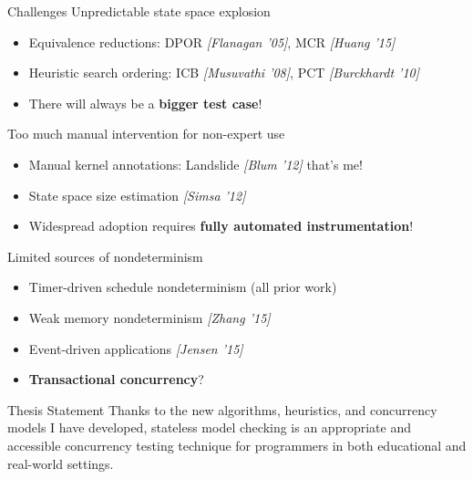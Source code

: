 \documentclass[xcolor=dvipsnames]{beamer}
\begin{document}
\begin{frame}{Challenges} %
	Unpredictable state space explosion
	\begin{itemize}
		\item Equivalence reductions: DPOR {\em [Flanagan '05]}, MCR {\em [Huang '15]}
		\item Heuristic search ordering: ICB {\em [Musuvathi '08]}, PCT {\em [Burckhardt '10]}
		\item There will always be a {\bf bigger test case}!
	\end{itemize}
	\pause
	\linegap

	Too much manual intervention for non-expert use
	\begin{itemize}
		\item Manual kernel annotations: Landslide {\em [Blum '12]} {\tiny that's me!}
		\item State space size estimation {\em [Simsa '12]}
		\item Widespread adoption requires {\bf fully automated instrumentation}!
	\end{itemize}
	\pause
	\linegap

	Limited sources of nondeterminism
	\begin{itemize}
		\item Timer-driven schedule nondeterminism (all prior work)
		\item Weak memory nondeterminism {\em [Zhang '15]}
		\item Event-driven applications {\em [Jensen '15]}
		\item {\bf Transactional concurrency}?
	\end{itemize}
\end{frame}


\begin{frame}{Thesis Statement}
	Thanks to the new algorithms, heuristics, and concurrency models I have developed,
	stateless model checking is an appropriate and accessible concurrency testing technique
	for programmers in both educational and real-world settings.
\end{frame}
\end{document}
